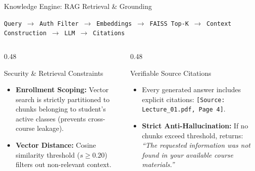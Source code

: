\documentclass[aspectratio=169,10pt]{beamer}
\begin{document}
\begin{frame}{Knowledge Engine: RAG Retrieval \& Grounding}
  \begin{center}
    \footnotesize
    \texttt{Query $\to$ Auth Filter $\to$ Embeddings $\to$ FAISS Top-K $\to$ Context Construction $\to$ LLM $\to$ Citations}
  \end{center}
  \begin{columns}[T]
    \begin{column}{0.48\textwidth}
      \begin{block}{Security \& Retrieval Constraints}
        \begin{itemize}
          \item \textbf{Enrollment Scoping:} Vector search is strictly partitioned to chunks belonging to student's active classes (prevents cross-course leakage).
          \item \textbf{Vector Distance:} Cosine similarity threshold ($s \ge 0.20$) filters out non-relevant context.
        \end{itemize}
      \end{block}
    \end{column}
    \begin{column}{0.48\textwidth}
      \begin{block}{Verifiable Source Citations}
        \begin{itemize}
          \item Every generated answer includes explicit citations: \texttt{[Source: Lecture\_01.pdf, Page 4]}.
          \item \textbf{Strict Anti-Hallucination:} If no chunks exceed threshold, returns: \textit{``The requested information was not found in your available course materials.''}
        \end{itemize}
      \end{block}
    \end{column}
  \end{columns}
\end{frame}
\end{document}
